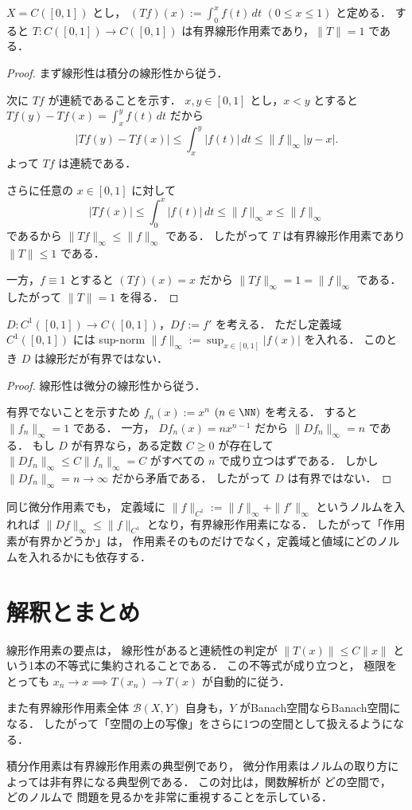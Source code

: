\begin{example}[積分作用素]
$X=C([0,1])$ とし，
$(Tf)(x):=\int_0^x f(t)\,dt$ $(0\le x\le 1)$ と定める．
すると
$T:C([0,1])\to C([0,1])$ は有界線形作用素であり，$\|T\|=1$ である．
\end{example}
\begin{proof}
まず線形性は積分の線形性から従う．

次に $Tf$ が連続であることを示す．
$x,y\in[0,1]$ とし，$x<y$ とすると
$Tf(y)-Tf(x)=\int_x^y f(t)\,dt$ だから
\[
|Tf(y)-Tf(x)|
\le
\int_x^y |f(t)|\,dt
\le
\|f\|_\infty |y-x|.
\]
よって $Tf$ は連続である．

さらに任意の $x\in[0,1]$ に対して
\[
|Tf(x)|
\le
\int_0^x |f(t)|\,dt
\le
\|f\|_\infty x
\le
\|f\|_\infty
\]
であるから
$\|Tf\|_\infty\le \|f\|_\infty$ である．
したがって $T$ は有界線形作用素であり $\|T\|\le 1$ である．

一方，$f\equiv 1$ とすると
$(Tf)(x)=x$ だから $\|Tf\|_\infty=1=\|f\|_\infty$ である．
したがって $\|T\|=1$ を得る．
\end{proof}

\begin{example}[非有界な微分作用素]
$D:C^1([0,1])\to C([0,1])$，$Df:=f'$ を考える．
ただし定義域 $C^1([0,1])$ には sup-norm
$\|f\|_\infty:=\sup_{x\in[0,1]}|f(x)|$ を入れる．
このとき $D$ は線形だが有界ではない．
\end{example}
\begin{proof}
線形性は微分の線形性から従う．

有界でないことを示すため
$f_n(x):=x^n$ $(n\in\NN)$ を考える．
すると
$\|f_n\|_\infty=1$ である．
一方，
$Df_n(x)=nx^{n-1}$ だから $\|Df_n\|_\infty=n$ である．
もし $D$ が有界なら，ある定数 $C\ge 0$ が存在して
$\|Df_n\|_\infty\le C\|f_n\|_\infty=C$ がすべての $n$ で成り立つはずである．
しかし
$\|Df_n\|_\infty=n\to\infty$ だから矛盾である．
したがって $D$ は有界ではない．
\end{proof}

\begin{remark}
同じ微分作用素でも，
定義域に
$\|f\|_{C^1}:=\|f\|_\infty+\|f'\|_\infty$ というノルムを入れれば
$\|Df\|_\infty\le \|f\|_{C^1}$ となり，有界線形作用素になる．
したがって「作用素が有界かどうか」は，
作用素そのものだけでなく，定義域と値域にどのノルムを入れるかにも依存する．
\end{remark}

\section{解釈とまとめ}

線形作用素の要点は，
線形性があると連続性の判定が
$\|T(x)\|\le C\|x\|$ という1本の不等式に集約されることである．
この不等式が成り立つと，
極限をとっても
$x_n\to x \implies T(x_n)\to T(x)$ が自動的に従う．

また有界線形作用素全体
$\mathcal B(X,Y)$ 自身も，$Y$ がBanach空間ならBanach空間になる．
したがって「空間の上の写像」をさらに1つの空間として扱えるようになる．

積分作用素は有界線形作用素の典型例であり，
微分作用素はノルムの取り方によっては非有界になる典型例である．
この対比は，関数解析が
$\text{どの空間で}$，$\text{どのノルムで}$ 問題を見るかを非常に重視することを示している．

